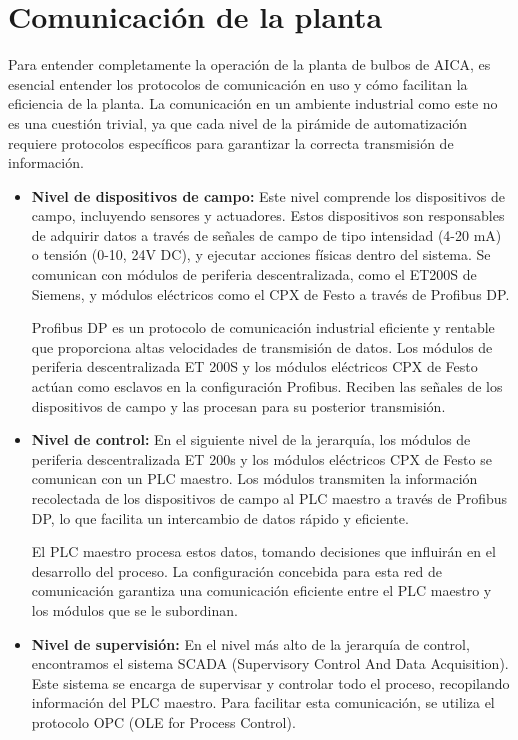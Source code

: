 \section{Comunicación de la planta}

Para entender completamente la operación de la planta de bulbos de AICA, es esencial entender los protocolos de comunicación
en uso y cómo facilitan la eficiencia de la planta. La comunicación en un ambiente industrial como este no es una cuestión
trivial, ya que cada nivel de la pirámide de automatización requiere protocolos específicos para garantizar la correcta
transmisión de información.

\begin{itemize}
      \item \textbf{Nivel de dispositivos de campo:} Este nivel comprende los dispositivos de campo, incluyendo sensores y
            actuadores. Estos dispositivos son responsables de adquirir datos a través de señales de campo de tipo intensidad
            (4-20 mA) o tensión (0-10, 24V DC), y ejecutar acciones físicas dentro del sistema. Se comunican con módulos de
            periferia descentralizada, como el ET200S de Siemens, y módulos eléctricos como el CPX de Festo a través de Profibus DP.

            Profibus DP es un protocolo de comunicación industrial eficiente y rentable que proporciona altas velocidades
            de transmisión de datos. Los módulos de periferia descentralizada ET 200S y los módulos eléctricos CPX de Festo
            actúan como esclavos en la configuración Profibus. Reciben las señales de los dispositivos de campo y las
            procesan para su posterior transmisión.


      \item \textbf{Nivel de control:} En el siguiente nivel de la jerarquía, los módulos de periferia descentralizada
            ET 200s y los módulos eléctricos CPX de Festo se comunican con un PLC maestro. Los módulos transmiten la
            información recolectada de los dispositivos de campo al PLC maestro a través de Profibus DP, lo que facilita
            un intercambio de datos rápido y eficiente.

            El PLC maestro procesa estos datos, tomando decisiones que influirán en el desarrollo del proceso. La
            configuración concebida para esta red de comunicación garantiza una comunicación eficiente entre el
            PLC maestro y los módulos que se le subordinan.

      \item \textbf{Nivel de supervisión:} En el nivel más alto de la jerarquía de control, encontramos el
            sistema SCADA (Supervisory Control And Data Acquisition). Este sistema se encarga de supervisar y
            controlar todo el proceso, recopilando información del PLC maestro. Para facilitar esta comunicación,
            se utiliza el protocolo OPC (OLE for Process Control).


\end{itemize}
